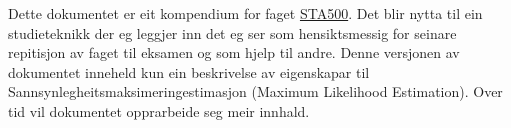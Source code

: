 Dette dokumentet er eit kompendium for faget \href{https://www.uis.no/course/?code=STA500_1&parentcat=9074}{STA500}. Det blir nytta til ein studieteknikk der eg leggjer inn det eg ser som hensiktsmessig for seinare repitisjon av faget til eksamen og som hjelp til andre. Denne versjonen av dokumentet inneheld kun  ein beskrivelse av eigenskapar til Sannsynlegheitsmaksimeringestimasjon (Maximum Likelihood Estimation). Over tid vil dokumentet opprarbeide seg meir innhald.